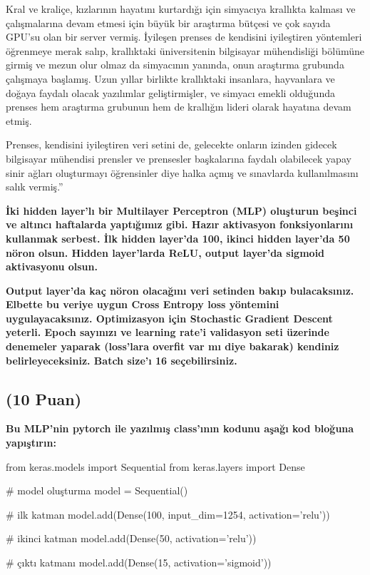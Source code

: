 \documentclass[11pt]{article}
\begin{document}
\begin{itemize}
\begin{itemize}
Kral ve kraliçe, kızlarının hayatını kurtardığı için simyacıya krallıkta kalması ve çalışmalarına devam etmesi için büyük bir araştırma bütçesi ve çok sayıda GPU'su olan bir server vermiş. İyileşen prenses de kendisini iyileştiren yöntemleri öğrenmeye merak salıp, krallıktaki üniversitenin bilgisayar mühendisliği bölümüne girmiş ve mezun olur olmaz da simyacının yanında, onun araştırma grubunda çalışmaya başlamış. Uzun yıllar birlikte krallıktaki insanlara, hayvanlara ve doğaya faydalı olacak yazılımlar geliştirmişler, ve simyacı emekli olduğunda prenses hem araştırma grubunun hem de krallığın lideri olarak hayatına devam etmiş.

Prenses, kendisini iyileştiren veri setini de, gelecekte onların izinden gidecek bilgisayar mühendisi prensler ve prensesler başkalarına faydalı olabilecek yapay sinir ağları oluşturmayı öğrensinler diye halka açmış ve sınavlarda kullanılmasını salık vermiş.''

\textbf{İki hidden layer'lı bir Multilayer Perceptron (MLP) oluşturun beşinci ve altıncı haftalarda yaptığımız gibi. Hazır aktivasyon fonksiyonlarını kullanmak serbest. İlk hidden layer'da 100, ikinci hidden layer'da 50 nöron olsun. Hidden layer'larda ReLU, output layer'da sigmoid aktivasyonu olsun.}

\textbf{Output layer'da kaç nöron olacağını veri setinden bakıp bulacaksınız. Elbette bu veriye uygun Cross Entropy loss yöntemini uygulayacaksınız. Optimizasyon için Stochastic Gradient Descent yeterli. Epoch sayınızı ve learning rate'i validasyon seti üzerinde denemeler yaparak (loss'lara overfit var mı diye bakarak) kendiniz belirleyeceksiniz. Batch size'ı 16 seçebilirsiniz.}

\subsection{(10 Puan)} \textbf{Bu MLP'nin pytorch ile yazılmış class'ının kodunu aşağı kod bloğuna yapıştırın:}

\begin{python}
from keras.models import Sequential
from keras.layers import Dense

# model oluşturma
model = Sequential()

# ilk katman 
model.add(Dense(100, input_dim=1254, activation='relu'))

# ikinci katman
model.add(Dense(50, activation='relu'))

# çıktı katmanı
model.add(Dense(15, activation='sigmoid'))


\end{python}
\end{itemize}
\end{itemize}
\end{document}
